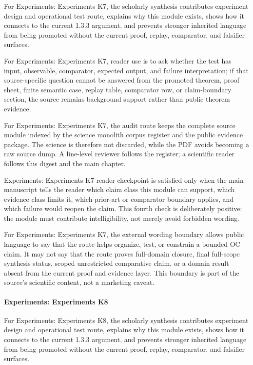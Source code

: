 For Experiments: Experiments K7, the scholarly synthesis contributes experiment design and operational test route, explains why this module exists, shows how it connects to the current 1.3.3 argument, and prevents stronger inherited language from being promoted without the current proof, replay, comparator, and falsifier surfaces.


For Experiments: Experiments K7, reader use is to ask whether the test has input, observable, comparator, expected output, and failure interpretation; if that source-specific question cannot be answered from the promoted theorem, proof sheet, finite semantic case, replay table, comparator row, or claim-boundary section, the source remains background support rather than public theorem evidence.


For Experiments: Experiments K7, the audit route keeps the complete source module indexed by the science monolith corpus register and the public evidence package. The science is therefore not discarded, while the PDF avoids becoming a raw source dump. A line-level reviewer follows the register; a scientific reader follows this digest and the main chapter.


Experiments: Experiments K7 reader checkpoint is satisfied only when the main manuscript tells the reader which claim class this module can support, which evidence class limits it, which prior-art or comparator boundary applies, and which failure would reopen the claim. This fourth check is deliberately positive: the module must contribute intelligibility, not merely avoid forbidden wording.


For Experiments: Experiments K7, the external wording boundary allows public language to say that the route helps organize, test, or constrain a bounded OC claim. It may not say that the route proves full-domain closure, final full-scope synthesis status, scoped unrestricted comparative claim, or a domain result absent from the current proof and evidence layer. This boundary is part of the source's scientific content, not a marketing caveat.


\paragraph{Experiments: Experiments K8}

For Experiments: Experiments K8, the scholarly synthesis contributes experiment design and operational test route, explains why this module exists, shows how it connects to the current 1.3.3 argument, and prevents stronger inherited language from being promoted without the current proof, replay, comparator, and falsifier surfaces.



